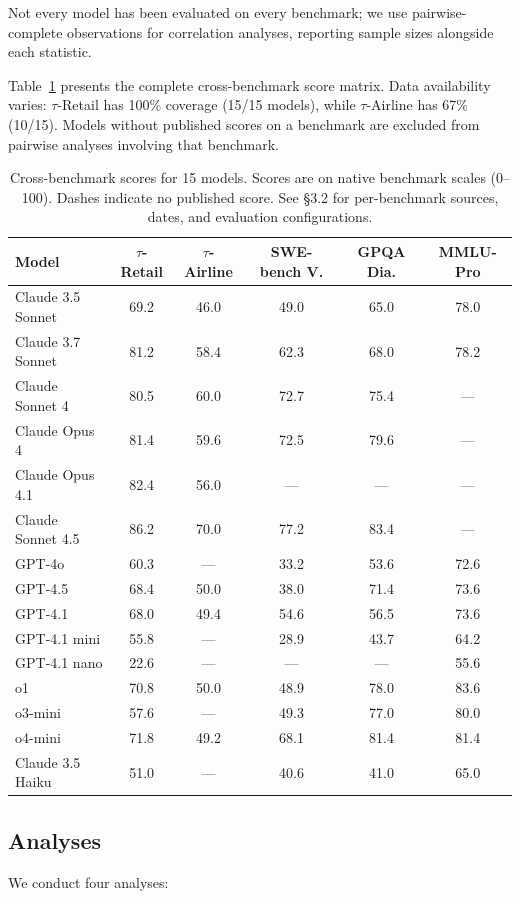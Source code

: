 \documentclass[sigconf]{acmart}
\begin{document}
Not every model has been evaluated on every benchmark; we use pairwise-complete observations for correlation analyses, reporting sample sizes alongside each statistic.

Table~\ref{tab:scores} presents the complete cross-benchmark score matrix. Data availability varies: $\tau$-Retail has 100\% coverage (15/15 models), while $\tau$-Airline has 67\% (10/15). Models without published scores on a benchmark are excluded from pairwise analyses involving that benchmark.

\begin{table}[t]
\caption{Cross-benchmark scores for 15 models. Scores are on native benchmark scales (0--100). Dashes indicate no published score. See \S3.2 for per-benchmark sources, dates, and evaluation configurations.}
\label{tab:scores}
\begin{tabular}{lccccc}
\toprule
Model & $\tau$-Retail & $\tau$-Airline & SWE-bench V. & GPQA Dia. & MMLU-Pro \\
\midrule
Claude 3.5 Sonnet & 69.2 & 46.0 & 49.0 & 65.0 & 78.0 \\
Claude 3.7 Sonnet & 81.2 & 58.4 & 62.3 & 68.0 & 78.2 \\
Claude Sonnet 4 & 80.5 & 60.0 & 72.7 & 75.4 & --- \\
Claude Opus 4 & 81.4 & 59.6 & 72.5 & 79.6 & --- \\
Claude Opus 4.1 & 82.4 & 56.0 & --- & --- & --- \\
Claude Sonnet 4.5 & 86.2 & 70.0 & 77.2 & 83.4 & --- \\
GPT-4o & 60.3 & --- & 33.2 & 53.6 & 72.6 \\
GPT-4.5 & 68.4 & 50.0 & 38.0 & 71.4 & 73.6 \\
GPT-4.1 & 68.0 & 49.4 & 54.6 & 56.5 & 73.6 \\
GPT-4.1 mini & 55.8 & --- & 28.9 & 43.7 & 64.2 \\
GPT-4.1 nano & 22.6 & --- & --- & --- & 55.6 \\
o1 & 70.8 & 50.0 & 48.9 & 78.0 & 83.6 \\
o3-mini & 57.6 & --- & 49.3 & 77.0 & 80.0 \\
o4-mini & 71.8 & 49.2 & 68.1 & 81.4 & 81.4 \\
Claude 3.5 Haiku & 51.0 & --- & 40.6 & 41.0 & 65.0 \\
\bottomrule
\end{tabular}
\end{table}

\subsection{Analyses}
We conduct four analyses:
\end{document}
